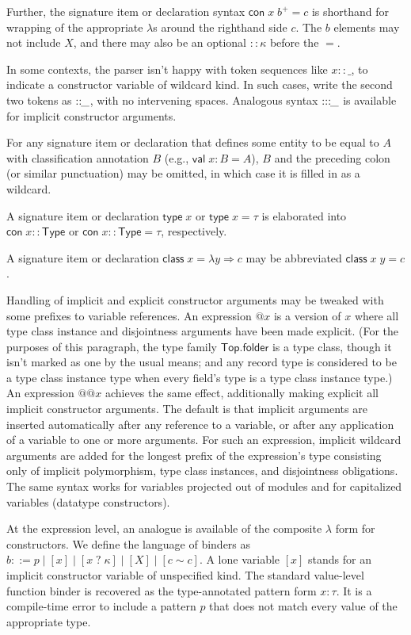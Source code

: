 \documentclass{article}
\newcommand{\mt}[1]{\mathsf{#1}}
\begin{document}
Further, the signature item or declaration syntax $\mt{con} \; x \; b^+ = c$ is shorthand for wrapping of the appropriate $\lambda$s around the righthand side $c$.  The $b$ elements may not include $X$, and there may also be an optional $:: \kappa$ before the $=$.

In some contexts, the parser isn't happy with token sequences like $x :: \_$, to indicate a constructor variable of wildcard kind.  In such cases, write the second two tokens as $::\hspace{-.05in}\_$, with no intervening spaces.  Analogous syntax $:::\hspace{-.05in}\_$ is available for implicit constructor arguments.

For any signature item or declaration that defines some entity to be equal to $A$ with classification annotation $B$ (e.g., $\mt{val} \; x : B = A$), $B$ and the preceding colon (or similar punctuation) may be omitted, in which case it is filled in as a wildcard.

A signature item or declaration $\mt{type} \; x$ or $\mt{type} \; x = \tau$ is elaborated into $\mt{con} \; x :: \mt{Type}$ or $\mt{con} \; x :: \mt{Type} = \tau$, respectively.

A signature item or declaration $\mt{class} \; x = \lambda y \Rightarrow c$ may be abbreviated $\mt{class} \; x \; y = c$.

Handling of implicit and explicit constructor arguments may be tweaked with some prefixes to variable references.  An expression $@x$ is a version of $x$ where all type class instance and disjointness arguments have been made explicit.  (For the purposes of this paragraph, the type family $\mt{Top.folder}$ is a type class, though it isn't marked as one by the usual means; and any record type is considered to be a type class instance type when every field's type is a type class instance type.)  An expression $@@x$ achieves the same effect, additionally making explicit all implicit constructor arguments.  The default is that implicit arguments are inserted automatically after any reference to a variable, or after any application of a variable to one or more arguments.  For such an expression, implicit wildcard arguments are added for the longest prefix of the expression's type consisting only of implicit polymorphism, type class instances, and disjointness obligations.  The same syntax works for variables projected out of modules and for capitalized variables (datatype constructors).

At the expression level, an analogue is available of the composite $\lambda$ form for constructors.  We define the language of binders as $b ::= p \mid [x] \mid [x \; ? \; \kappa] \mid [X] \mid [c \sim c]$.  A lone variable $[x]$ stands for an implicit constructor variable of unspecified kind.  The standard value-level function binder is recovered as the type-annotated pattern form $x : \tau$.  It is a compile-time error to include a pattern $p$ that does not match every value of the appropriate type.
\end{document}

